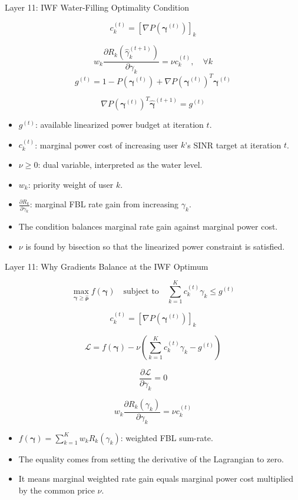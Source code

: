 \documentclass{beamer}
\begin{document}
\begin{frame}{Layer 11: IWF Water-Filling Optimality Condition}
\scriptsize

\[
c_k^{(t)}
=
\left[\nabla P(\boldsymbol{\gamma}^{(t)})\right]_k
\]

\[
w_k
\frac{\partial R_k(\widehat{\gamma}_k^{(t+1)})}
{\partial \gamma_k}
=
\nu c_k^{(t)},
\quad \forall k
\]
\[
g^{(t)}
=
1
-
P(\boldsymbol{\gamma}^{(t)})
+
\nabla P(\boldsymbol{\gamma}^{(t)})^T
\boldsymbol{\gamma}^{(t)}
\]

\[
    \nabla P(\boldsymbol{\gamma}^{(t)})^T
    \widehat{\boldsymbol{\gamma}}^{(t+1)}
    =
    g^{(t)}
\]

\begin{itemize}
    \item \(g^{(t)}\): available linearized power budget at iteration \(t\).
    \item \(c_k^{(t)}\): marginal power cost of increasing user \(k\)'s SINR target at iteration \(t\).
    \item \(\nu\ge0\): dual variable, interpreted as the water level.
    \item \(w_k\): priority weight of user \(k\).
    \item \(\frac{\partial R_k}{\partial\gamma_k}\): marginal FBL rate gain from increasing \(\gamma_k\).
    \item The condition balances marginal rate gain against marginal power cost.
    \item \(\nu\) is found by bisection so that the linearized power constraint is satisfied.
\end{itemize}

\end{frame}
\begin{frame}{Layer 11: Why Gradients Balance at the IWF Optimum}
\scriptsize

\[
\max_{\boldsymbol{\gamma}\ge\widehat{\boldsymbol{\rho}}}
f(\boldsymbol{\gamma})
\quad
\text{subject to}
\quad
\sum_{k=1}^{K}c_k^{(t)}\gamma_k \le g^{(t)}
\]

\[
c_k^{(t)}
=
[\nabla P(\boldsymbol{\gamma}^{(t)})]_k
\]

\[
\mathcal{L}
=
f(\boldsymbol{\gamma})
-
\nu
\left(
\sum_{k=1}^{K}c_k^{(t)}\gamma_k-g^{(t)}
\right)
\]

\[
\frac{\partial \mathcal{L}}{\partial \gamma_k}=0
\]

\[
w_k\frac{\partial R_k(\gamma_k)}{\partial \gamma_k}
=
\nu c_k^{(t)}
\]

\begin{itemize}
    \item \(f(\boldsymbol{\gamma})=\sum_{k=1}^{K}w_kR_k(\gamma_k)\): weighted FBL sum-rate.
    \item The equality comes from setting the derivative of the Lagrangian to zero.
    \item It means marginal weighted rate gain equals marginal power cost multiplied by the common price \(\nu\).
\end{itemize}

\end{frame}
\end{document}
